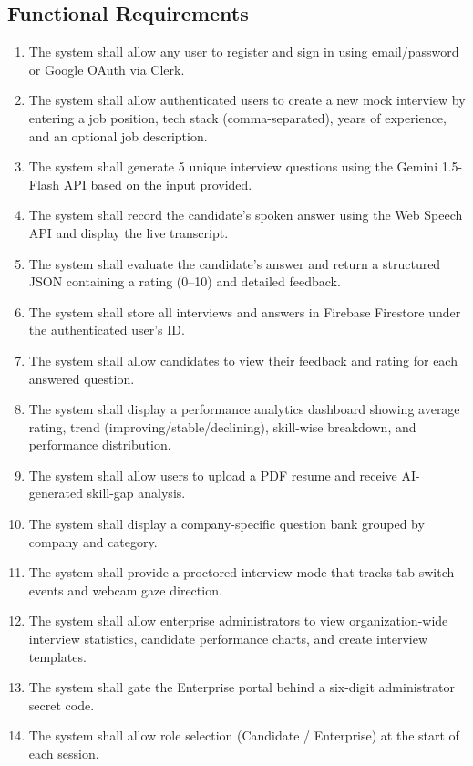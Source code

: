 \documentclass{fisatprojectfinal}
\begin{document}
\subsection{Functional Requirements}
\begin{enumerate}
  \item The system shall allow any user to register and sign in using email/password or
        Google OAuth via Clerk.
  \item The system shall allow authenticated users to create a new mock interview by entering
        a job position, tech stack (comma-separated), years of experience, and an optional
        job description.
  \item The system shall generate 5 unique interview questions using the Gemini 1.5-Flash
        API based on the input provided.
  \item The system shall record the candidate's spoken answer using the Web Speech API and
        display the live transcript.
  \item The system shall evaluate the candidate's answer and return a structured JSON
        containing a rating (0--10) and detailed feedback.
  \item The system shall store all interviews and answers in Firebase Firestore under the
        authenticated user's ID.
  \item The system shall allow candidates to view their feedback and rating for each
        answered question.
  \item The system shall display a performance analytics dashboard showing average rating,
        trend (improving/stable/declining), skill-wise breakdown, and performance
        distribution.
  \item The system shall allow users to upload a PDF resume and receive AI-generated
        skill-gap analysis.
  \item The system shall display a company-specific question bank grouped by company and
        category.
  \item The system shall provide a proctored interview mode that tracks tab-switch events
        and webcam gaze direction.
  \item The system shall allow enterprise administrators to view organization-wide interview
        statistics, candidate performance charts, and create interview templates.
  \item The system shall gate the Enterprise portal behind a six-digit administrator secret
        code.
  \item The system shall allow role selection (Candidate / Enterprise) at the start of each
        session.
\end{enumerate}
\end{document}
